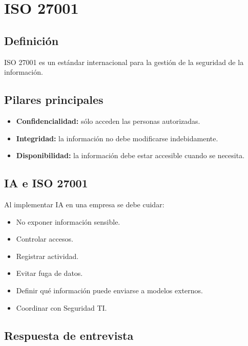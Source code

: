 \documentclass[12pt]{article}
\begin{document}
\section{ISO 27001}

\subsection{Definición}

ISO 27001 es un estándar internacional para la gestión de la seguridad de la información.

\subsection{Pilares principales}

\begin{itemize}
    \item \textbf{Confidencialidad:} sólo acceden las personas autorizadas.
    \item \textbf{Integridad:} la información no debe modificarse indebidamente.
    \item \textbf{Disponibilidad:} la información debe estar accesible cuando se necesita.
\end{itemize}

\subsection{IA e ISO 27001}

Al implementar IA en una empresa se debe cuidar:

\begin{itemize}
    \item No exponer información sensible.
    \item Controlar accesos.
    \item Registrar actividad.
    \item Evitar fuga de datos.
    \item Definir qué información puede enviarse a modelos externos.
    \item Coordinar con Seguridad TI.
\end{itemize}

\subsection{Respuesta de entrevista}
\end{document}
